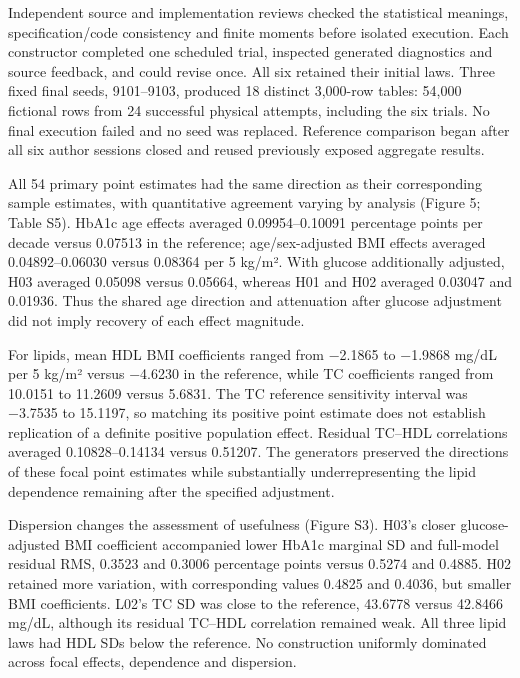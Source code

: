 \documentclass[sigconf,review]{acmart}
\begin{document}
Independent source and implementation reviews checked the statistical meanings, specification/\allowbreak{}code consistency and finite moments before isolated execution. Each constructor completed one scheduled trial, inspected generated diagnostics and source feedback, and could revise once. All six retained their initial laws. Three fixed final seeds, 9101–\allowbreak{}9103, produced 18 distinct 3,000-row tables: 54,000 fictional rows from 24 successful physical attempts, including the six trials. No final execution failed and no seed was replaced. Reference comparison began after all six author sessions closed and reused previously exposed aggregate results.


All 54 primary point estimates had the same direction as their corresponding sample estimates, with quantitative agreement varying by analysis (Figure 5; Table S5). HbA1c age effects averaged 0.09954–\allowbreak{}0.10091 percentage points per decade versus 0.07513 in the reference; age/\allowbreak{}sex-adjusted BMI effects averaged 0.04892–\allowbreak{}0.06030 versus 0.08364 per 5 kg/\allowbreak{}m². With glucose additionally adjusted, H03 averaged 0.05098 versus 0.05664, whereas H01 and H02 averaged 0.03047 and 0.01936. Thus the shared age direction and attenuation after glucose adjustment did not imply recovery of each effect magnitude.


For lipids, mean HDL BMI coefficients ranged from −2.1865 to −1.9868 mg/\allowbreak{}dL per 5 kg/\allowbreak{}m² versus −4.6230 in the reference, while TC coefficients ranged from 10.0151 to 11.2609 versus 5.6831. The TC reference sensitivity interval was −3.7535 to 15.1197, so matching its positive point estimate does not establish replication of a definite positive population effect. Residual TC–\allowbreak{}HDL correlations averaged 0.10828–\allowbreak{}0.14134 versus 0.51207. The generators preserved the directions of these focal point estimates while substantially underrepresenting the lipid dependence remaining after the specified adjustment.


Dispersion changes the assessment of usefulness (Figure S3). H03's closer glucose-adjusted BMI coefficient accompanied lower HbA1c marginal SD and full-model residual RMS, 0.3523 and 0.3006 percentage points versus 0.5274 and 0.4885. H02 retained more variation, with corresponding values 0.4825 and 0.4036, but smaller BMI coefficients. L02's TC SD was close to the reference, 43.6778 versus 42.8466 mg/\allowbreak{}dL, although its residual TC–\allowbreak{}HDL correlation remained weak. All three lipid laws had HDL SDs below the reference. No construction uniformly dominated across focal effects, dependence and dispersion.
\end{document}
